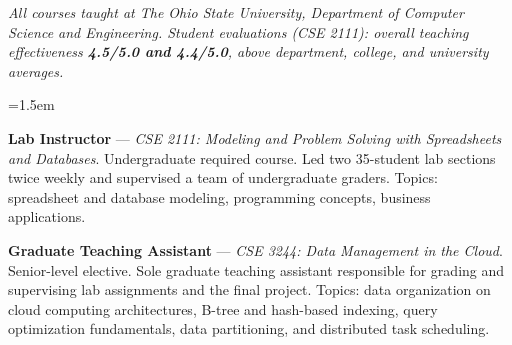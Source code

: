 \smallskip{}\par\nobreak\vspace{2pt}
{\small\noindent \textit{All courses taught at The Ohio State University, Department of Computer Science and Engineering. Student evaluations (CSE 2111): overall teaching effectiveness \textbf{4.5/5.0 and 4.4/5.0}, above department, college, and university averages.}\par}\vspace{2pt}
{\leftskip=1.5em
{\small
\textbf{Lab Instructor} --- \textit{CSE 2111: Modeling and Problem Solving with Spreadsheets and Databases}. Undergraduate required course. Led two 35-student lab sections twice weekly and supervised a team of undergraduate graders. Topics: spreadsheet and database modeling, programming concepts, business applications.

\textbf{Graduate Teaching Assistant} --- \textit{CSE 3244: Data Management in the Cloud}. Senior-level elective. Sole graduate teaching assistant responsible for grading and supervising lab assignments and the final project. Topics: data organization on cloud computing architectures, B-tree and hash-based indexing, query optimization fundamentals, data partitioning, and distributed task scheduling.
\par}
}

